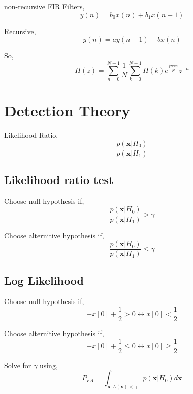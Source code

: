 \documentclass[12pt]{article}
\begin{document}
non-recursive FIR Filters,
\begin{equation}
    y(n) = b_0 x(n) + b_1 x(n-1)
\end{equation}

Recursive,
\begin{equation}
    y(n) = a y(n-1) + bx(n)
\end{equation}

So,
\begin{equation}
    H(z) = \sum_{n=0}^{N-1} \frac{1}{N} \sum_{k=0}^{N-1} H(k) e^{\frac{j2\pi kn}{N}}z^{-n} 
\end{equation}

\section{Detection Theory}

Likelihood Ratio,
\begin{equation}
    \frac{p(\textbf{x}|H_0)}{p(\textbf{x}|H_1)}
\end{equation}

\subsection{Likelihood ratio test}

Choose null hypothesis if,
\begin{equation}
    \frac{p(\textbf{x}|H_0)}{p(\textbf{x}|H_1)} > \gamma
\end{equation}

Choose alternitive hypothesis if,
\begin{equation}
    \frac{p(\textbf{x}|H_0)}{p(\textbf{x}|H_1)} \leq \gamma
\end{equation}

\subsection{Log Likelihood}
Choose null hypothesis if,
\begin{equation}
    -x[0] + \frac{1}{2} > 0 \leftrightarrow x[0] < \frac{1}{2}
\end{equation}

Choose alternitive hypothesis if,
\begin{equation}
    -x[0] + \frac{1}{2} \leq 0 \leftrightarrow x[0] \geq \frac{1}{2}
\end{equation}

Solve for $\gamma$ using,
\begin{equation}
    P_{FA} = \int_{\textbf{x}:L(\textbf{x})<\gamma}p(\textbf{x}|H_0)d\textbf{x}
\end{equation}
\end{document}
